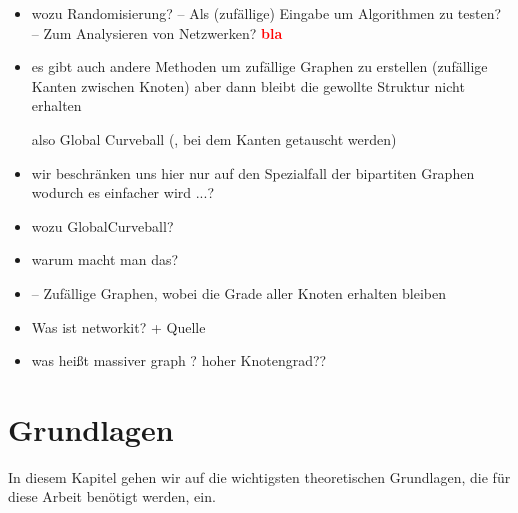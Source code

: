 \documentclass[a4paper]{scrreprt}
\theoremstyle{plain} %
\theoremstyle{definition} %
\newcommand{\red}[1]{\textcolor{red}{\textbf{#1}}}
\begin{document}
\begin{itemize}

\item
wozu Randomisierung?
-- Als (zufällige) Eingabe um Algorithmen zu testen?
-- Zum Analysieren von Netzwerken?
\red{bla}

\item
es gibt auch andere Methoden um zufällige Graphen zu erstellen (zufällige Kanten zwischen Knoten)
aber dann bleibt die gewollte Struktur nicht erhalten

also Global Curveball (, bei dem Kanten getauscht werden)


\item
wir beschränken uns hier nur auf den Spezialfall der bipartiten Graphen wodurch es einfacher wird ...?

\item
wozu GlobalCurveball?

\item
warum macht man das?

\item-- Zufällige Graphen, wobei die Grade aller Knoten erhalten bleiben

\item
Was ist networkit? +  Quelle

\item
was heißt massiver graph ? 
hoher Knotengrad??

\end{itemize}





\chapter{Grundlagen}
In diesem Kapitel gehen wir auf die wichtigsten theoretischen Grundlagen, die für diese
Arbeit benötigt werden, ein.


\end{document}

